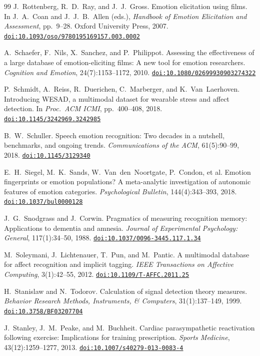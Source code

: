 \documentclass[11pt,a4paper]{article}
\newcommand{\doi}[1]{\href{https://doi.org/#1}{\nolinkurl{doi:#1}}}
\begin{document}
\begin{thebibliography}{99}
 J.~Rottenberg, R.~D.~Ray, and J.~J.~Gross. Emotion elicitation using films. In J.~A.~Coan
and J.~J.~B.~Allen (eds.), \emph{Handbook of Emotion Elicitation and Assessment}, pp.~9--28. Oxford University
Press, 2007. \doi{10.1093/oso/9780195169157.003.0002}

 A.~Schaefer, F.~Nils, X.~Sanchez, and P.~Philippot. Assessing the effectiveness of a large
database of emotion-eliciting films: A new tool for emotion researchers. \emph{Cognition and Emotion},
24(7):1153--1172, 2010. \doi{10.1080/02699930903274322}

 P.~Schmidt, A.~Reiss, R.~Duerichen, C.~Marberger, and K.~Van~Laerhoven. Introducing WESAD, a
multimodal dataset for wearable stress and affect detection. In \emph{Proc.\ ACM ICMI}, pp.~400--408, 2018.
\doi{10.1145/3242969.3242985}

 B.~W.~Schuller. Speech emotion recognition: Two decades in a nutshell, benchmarks, and ongoing
trends. \emph{Communications of the ACM}, 61(5):90--99, 2018. \doi{10.1145/3129340}

 E.~H.~Siegel, M.~K.~Sands, W.~Van~den~Noortgate, P.~Condon, et al. Emotion fingerprints or
emotion populations? A meta-analytic investigation of autonomic features of emotion categories.
\emph{Psychological Bulletin}, 144(4):343--393, 2018. \doi{10.1037/bul0000128}

 J.~G.~Snodgrass and J.~Corwin. Pragmatics of measuring recognition memory: Applications to
dementia and amnesia. \emph{Journal of Experimental Psychology: General}, 117(1):34--50, 1988.
\doi{10.1037/0096-3445.117.1.34}

 M.~Soleymani, J.~Lichtenauer, T.~Pun, and M.~Pantic. A multimodal database for affect
recognition and implicit tagging. \emph{IEEE Transactions on Affective Computing}, 3(1):42--55, 2012.
\doi{10.1109/T-AFFC.2011.25}

 H.~Stanislaw and N.~Todorov. Calculation of signal detection theory measures. \emph{Behavior
Research Methods, Instruments, \& Computers}, 31(1):137--149, 1999. \doi{10.3758/BF03207704}

 J.~Stanley, J.~M.~Peake, and M.~Buchheit. Cardiac parasympathetic reactivation following
exercise: Implications for training prescription. \emph{Sports Medicine}, 43(12):1259--1277, 2013.
\doi{10.1007/s40279-013-0083-4}


\end{thebibliography}
\end{document}
